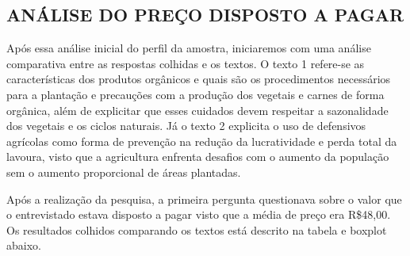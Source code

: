 \documentclass[a4paper,12pt]{article}[abntex2]
\begin{document}
\subsection{\textbf{ANÁLISE DO PREÇO DISPOSTO A PAGAR}}
Após essa análise inicial do perfil da amostra, iniciaremos com uma análise comparativa entre as respostas colhidas e os textos. O texto 1 refere-se as características dos produtos orgânicos e quais são os procedimentos necessários para a plantação e precauções com a produção dos vegetais e carnes de forma orgânica, além de explicitar que esses cuidados devem respeitar a sazonalidade dos vegetais e os ciclos naturais. Já o texto 2 explicita o uso de defensivos agrícolas como forma de prevenção na redução da lucratividade e perda total da lavoura, visto que a agricultura enfrenta desafios com o aumento da população sem o aumento proporcional de áreas plantadas. 

Após a realização da pesquisa, a primeira pergunta questionava sobre o valor que o entrevistado estava disposto a pagar visto que a média de preço era R\$48,00. Os resultados colhidos comparando os textos está descrito na tabela e boxplot abaixo. 
\end{document}
